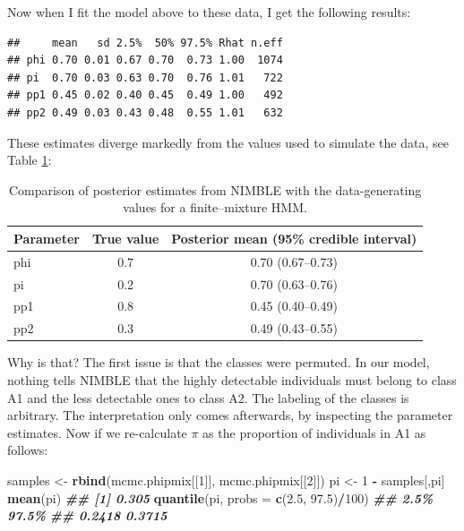 \documentclass[
  12pt,
]{krantz}
\newenvironment{Shaded}{\begin{snugshade}}{\end{snugshade}}
\newcommand{\AttributeTok}[1]{\textcolor[rgb]{0.13,0.29,0.53}{#1}}
\newcommand{\DecValTok}[1]{\textcolor[rgb]{0.00,0.00,0.81}{#1}}
\newcommand{\DocumentationTok}[1]{\textcolor[rgb]{0.56,0.35,0.01}{\textbf{\textit{#1}}}}
\newcommand{\FloatTok}[1]{\textcolor[rgb]{0.00,0.00,0.81}{#1}}
\newcommand{\FunctionTok}[1]{\textcolor[rgb]{0.13,0.29,0.53}{\textbf{#1}}}
\newcommand{\NormalTok}[1]{#1}
\newcommand{\OtherTok}[1]{\textcolor[rgb]{0.56,0.35,0.01}{#1}}
\newcommand{\SpecialCharTok}[1]{\textcolor[rgb]{0.81,0.36,0.00}{\textbf{#1}}}
\newcommand{\StringTok}[1]{\textcolor[rgb]{0.31,0.60,0.02}{#1}}
\begin{document}
Now when I fit the model above to these data, I get the following results:

\begin{verbatim}
##     mean   sd 2.5%  50% 97.5% Rhat n.eff
## phi 0.70 0.01 0.67 0.70  0.73 1.00  1074
## pi  0.70 0.03 0.63 0.70  0.76 1.01   722
## pp1 0.45 0.02 0.40 0.45  0.49 1.00   492
## pp2 0.49 0.03 0.43 0.48  0.55 1.01   632
\end{verbatim}

These estimates diverge markedly from the values used to simulate the data, see Table \ref{tab:simpar}:

\begin{table}

\caption{\label{tab:simpar}Comparison of posterior estimates from NIMBLE with the data-generating values for a finite--mixture HMM.}
\centering
\begin{tabular}[t]{l|c|c}
\hline
Parameter & True value & Posterior mean (95\% credible interval)\\
\hline
phi & 0.7 & 0.70 (0.67–0.73)\\
\hline
pi & 0.2 & 0.70 (0.63–0.76)\\
\hline
pp1 & 0.8 & 0.45 (0.40–0.49)\\
\hline
pp2 & 0.3 & 0.49 (0.43–0.55)\\
\hline
\end{tabular}
\end{table}

Why is that? The first issue is that the classes were permuted. In our model, nothing tells NIMBLE that the highly detectable individuals must belong to class A1 and the less detectable ones to class A2. The labeling of the classes is arbitrary. The interpretation only comes afterwards, by inspecting the parameter estimates. Now if we re-calculate \(\pi\) as the proportion of individuals in A1 as follows:

\begin{Shaded}
\begin{Highlighting}[]
\NormalTok{samples }\OtherTok{\textless{}{-}} \FunctionTok{rbind}\NormalTok{(mcmc.phipmix[[}\DecValTok{1}\NormalTok{]], mcmc.phipmix[[}\DecValTok{2}\NormalTok{]])}
\NormalTok{pi }\OtherTok{\textless{}{-}} \DecValTok{1} \SpecialCharTok{{-}}\NormalTok{ samples[,}\StringTok{\textquotesingle{}pi\textquotesingle{}}\NormalTok{]}
\FunctionTok{mean}\NormalTok{(pi)}
\DocumentationTok{\#\# [1] 0.305}
\FunctionTok{quantile}\NormalTok{(pi, }\AttributeTok{probs =} \FunctionTok{c}\NormalTok{(}\FloatTok{2.5}\NormalTok{, }\FloatTok{97.5}\NormalTok{)}\SpecialCharTok{/}\DecValTok{100}\NormalTok{)}
\DocumentationTok{\#\#   2.5\%  97.5\% }
\DocumentationTok{\#\# 0.2418 0.3715}
\end{Highlighting}
\end{Shaded}
\end{document}
